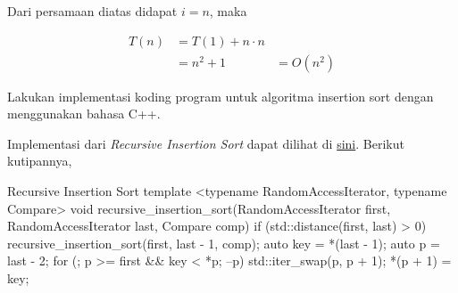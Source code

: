 Dari persamaan diatas didapat $i = n$, maka

\begin{align*}
    T(n) & = T(1) + n \cdot n \\
         & = n^2 + 1
         & = O(n^2)
\end{align*}


\Problem Lakukan implementasi koding program untuk algoritma insertion sort dengan menggunakan bahasa C++.

\TheSolution Implementasi dari \textit{Recursive Insertion Sort} dapat dilihat di \href{https://github.com/okka-riswana/AnalgoKu/blob/8db63a0d830d90c0f0fba2e2cc53272ffe58b6e7/src/analgoku4/sorting.hpp#L157}{sini}. Berikut kutipannya,

\begin{code}[cpp]{Recursive Insertion Sort}
template <typename RandomAccessIterator, typename Compare>
void recursive_insertion_sort(RandomAccessIterator first,
                              RandomAccessIterator last,
                              Compare comp) {
  if (std::distance(first, last) > 0) {
    recursive_insertion_sort(first, last - 1, comp);
    auto key = *(last - 1);
    auto p = last - 2;
    for (; p >= first && key < *p; --p) {
      std::iter_swap(p, p + 1);
    }
    *(p + 1) = key;
  }
}
\end{code}